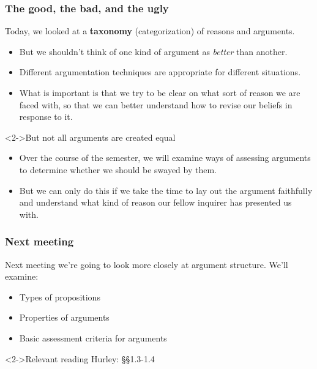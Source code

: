 \documentclass[10pt,letterpaper,xcolor=dvipsnames,handout]{beamer}
\begin{document}
\begin{frame}
\frametitle{The good, the bad, and the ugly}
\small

\begin{block}{Today, we looked at a \textbf{taxonomy} (categorization) of reasons and arguments.}
\begin{itemize} 
  \item But we shouldn't think of one kind of argument as \textit{better} than another.
  \item Different argumentation techniques are appropriate for different situations.
  \item What is important is that we try to be clear on what sort of reason we are faced with, so that we can better understand how to revise our beliefs in response to it.
\end{itemize}
\end{block}

\begin{block}<2->{But not all arguments are created equal}
\begin{itemize}
  \item Over the course of the semester, we will examine ways of assessing arguments to determine whether we should be swayed by them.
  \item But we can only do this if we take the time to lay out the argument faithfully and understand what kind of reason our fellow inquirer has presented us with.
\end{itemize}
\end{block}

\end{frame}

\begin{frame}
\frametitle{Next meeting}

Next meeting we're going to look more closely at argument structure. We'll examine:
\begin{itemize}
  \item Types of propositions
  \item Properties of arguments
  \item Basic assessment criteria for arguments
\end{itemize}

\begin{block}<2->{Relevant reading}
  Hurley: \S\S 1.3-1.4
\end{block}

\end{frame}
\end{document}
